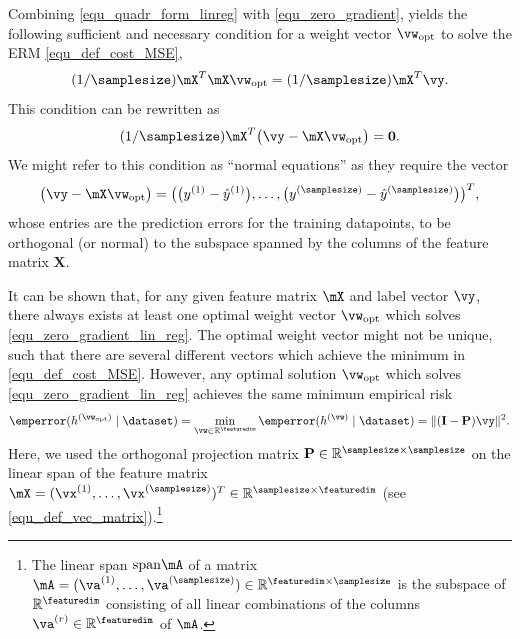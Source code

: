\documentclass[12pt]{report}
\begin{document}
Combining \eqref{equ_quadr_form_linreg} with \eqref{equ_zero_gradient}, 
yields the following sufficient and necessary condition for a weight vector 
$\vw_{\rm opt}$ to solve the ERM \eqref{equ_def_cost_MSE},
\begin{equation}
\label{equ_zero_gradient_lin_reg}
(1/\samplesize) \mX^{T} \mX \vw_{\rm opt} = (1/\samplesize) \mX^{T} \vy.  
\end{equation} 
This condition can be rewritten as 
\begin{equation}
\label{equ_zero_gradient_lin_reg_normal_condition}
(1/\samplesize) \mX^{T} \big( \vy - \mX \vw_{\rm opt} \big) = \mathbf{0}.  
\end{equation} 
We might refer to this condition as ``normal equations'' as they 
require the vector $$\big( \vy - \mX \vw_{\rm opt} \big) = \big(\big(y^{(1)}-\hat{y}^{(1)}\big),\ldots,\big(y^{(\samplesize)}-\hat{y}^{(\samplesize)}\big)  \big)^{T},$$
whose entries are the prediction errors for the training datapoints, to 
be orthogonal (or normal) to the subspace spanned by the columns 
of the feature matrix $\mathbf{X}$. 


It can be shown that, for any given feature matrix $\mX$ and label vector $\vy$, there always 
exists at least one optimal weight vector $\vw_{\rm opt}$ which solves \eqref{equ_zero_gradient_lin_reg}. 
The optimal weight vector might not be unique, such that there are several different vectors 
which achieve the minimum in \eqref{equ_def_cost_MSE}. However, any optimal solution $\vw_{\rm opt}$ 
which solves \eqref{equ_zero_gradient_lin_reg} achieves the same minimum empirical risk 
\begin{equation}
\label{equ_emp_risk_lin_proje}
\emperror(h^{(\vw_{\rm opt})} \mid \dataset) = \min_{\vw \in \mathbb{R}^{\featuredim}} \emperror(h^{(\vw)} \mid \dataset) = \|  (\mathbf{I}- \mathbf{P}) \vy \|^{2}.
\end{equation} 
Here, we used the orthogonal projection matrix $\mathbf{P} \in \mathbb{R}^{\samplesize \times \samplesize}$ 
on the linear span of the feature matrix $\mX = (\vx^{(1)},\ldots,\vx^{(\samplesize)})^{T} \in \mathbb{R}^{\samplesize \times \featuredim}$ (see \eqref{equ_def_vec_matrix}).\footnote{The linear span ${\rm span } \mA$ 
of a matrix $\mA=(\va^{(1)},\ldots,\va^{(\samplesize)}) \in \mathbb{R}^{\featuredim \times \samplesize}$ 
is the subspace of $\mathbb{R}^{\featuredim}$ consisting of all linear combinations 
of the columns $\va^{(r)} \in \mathbb{R}^{\featuredim}$ of $\mA$.} 
\end{document}
